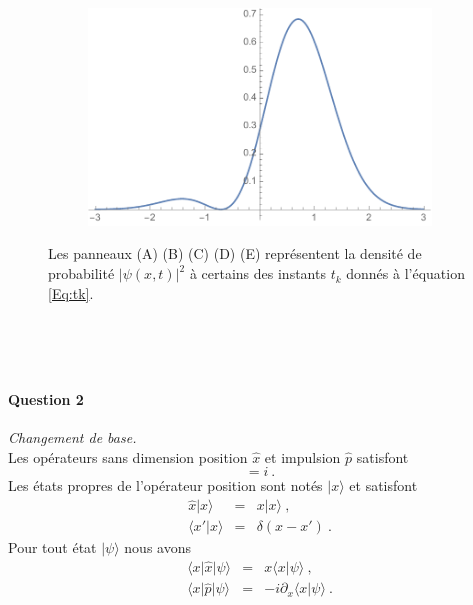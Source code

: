 \begin{enumerate}
\begin{figure}
    \vspace{1cm}
   \begin{subfigure}[t]{0.4\textwidth}
    \hfill       
        \centering
        \includegraphics[width=\linewidth]{Pictures/FigPsi0.pdf}
        \caption{} \label{fig:timingE}
    \end{subfigure}
 
        
    \caption{Les panneaux (A) (B) (C) (D) (E) représentent la densité de probabilité 
$ \vert \psi(x,t)\vert^2$ à certains des instants $t_k$ donnés à l'équation \eqref{Eq:tk}.}
\label{FigPsi2}
\end{figure}





\end{enumerate}



\newpage
\ 

\newpage
\ 

\newpage

\newpage

\paragraph{Question 2} \textit{Changement de base.} \\

Les opérateurs sans dimension position $\hat x$ et impulsion $\hat p$ satisfont 
\begin{equation}
[\hat x, \hat p ] = i\ .
\label{xp:1}
\end{equation}
Les états propres de l'opérateur position sont notés $\vert x \rangle$ et satisfont
\begin{eqnarray}
\hat x \vert x \rangle &=& x\vert x \rangle \ ,\label{xp:2B}\\
\langle x' \vert x \rangle &=& \delta (x-x') \ .
\label{xp:2}
\end{eqnarray}
Pour tout état $\vert \psi \rangle$ nous avons
\begin{eqnarray}
\langle x \vert \hat x \vert \psi \rangle &=& x  \langle x  \vert \psi \rangle \ ,
\label{xp:3}\\
\langle x \vert \hat p \vert \psi \rangle &=& -i \partial_x  \langle x  \vert \psi\rangle\ . \label{xp:4}
\end{eqnarray}

